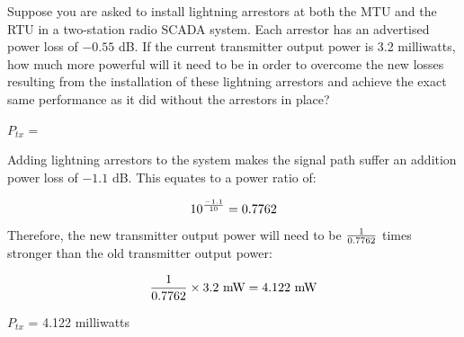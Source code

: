

Suppose you are asked to install lightning arrestors at both the MTU and the RTU in a two-station radio SCADA system.  Each arrestor has an advertised power loss of $-0.55$ dB.  If the current transmitter output power is 3.2 milliwatts, how much more powerful will it need to be in order to overcome the new losses resulting from the installation of these lightning arrestors and achieve the exact same performance as it did without the arrestors in place?

\vskip 10pt

$P_{tx}$ = 

\vskip 10pt







Adding lightning arrestors to the system makes the signal path suffer an addition power loss of $-1.1$ dB.  This equates to a power ratio of:

$$10^{-1.1 \over 10} = 0.7762$$

Therefore, the new transmitter output power will need to be $1 \over 0.7762$ times stronger than the old transmitter output power:

$${1 \over 0.7762} \times 3.2 \hbox{ mW} = 4.122 \hbox{ mW}$$

$P_{tx}$ = 4.122 milliwatts











